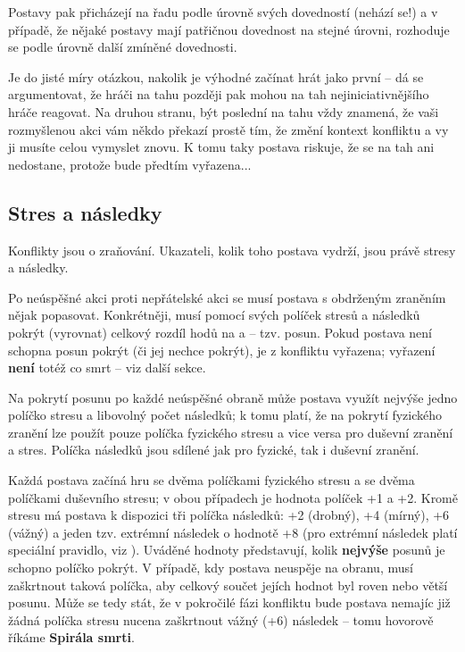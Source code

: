 \documentclass[../main.tex]{subfiles}
\begin{document}
Postavy pak přicházejí na řadu podle úrovně svých dovedností (nehází se!) a v případě, že
nějaké postavy mají patřičnou dovednost na stejné úrovni, rozhoduje se podle úrovně další
zmíněné dovednosti.

Je do jisté míry otázkou, nakolik je výhodné začínat hrát jako první – dá se
argumentovat, že hráči na tahu později pak mohou na tah nejiniciativnějšího hráče
reagovat. Na druhou stranu, být poslední na tahu vždy znamená, že vaši rozmyšlenou akci
vám někdo překazí prostě tím, že změní kontext konfliktu a vy ji musíte celou vymyslet
znovu. K tomu taky postava riskuje, že se na tah ani nedostane, protože bude předtím vyřazena...

\subsection{Stres a následky}
\label{sec:stres-nasledky}

Konflikty jsou o zraňování. Ukazateli, kolik toho postava vydrží, jsou právě stresy a následky.

Po neúspěšné akci  proti nepřátelské akci  se musí postava s
obdrženým zraněním nějak popasovat. Konkrétněji, musí pomocí svých políček stresů a
následků pokrýt (vyrovnat) celkový rozdíl hodů na  a  – tzv. posun.
Pokud postava není schopna posun pokrýt (či jej nechce pokrýt), je z konfliktu vyřazena;
vyřazení \textbf{není} totéž co smrt – viz další sekce.

Na pokrytí posunu po každé neúspěšné obraně může postava využít nejvýše jedno políčko
stresu a libovolný počet následků; k tomu platí, že na pokrytí fyzického zranění lze
použít pouze políčka fyzického stresu a vice versa pro duševní zranění a stres. Políčka
následků jsou sdílené jak pro fyzické, tak i duševní zranění.

Každá postava začíná hru se dvěma políčkami fyzického stresu a se dvěma políčkami
duševního stresu; v obou případech je hodnota políček +1 a +2. Kromě stresu má postava k
dispozici tři políčka následků: +2 (drobný), +4 (mírný), +6 (vážný) a jeden tzv. extrémní
následek o hodnotě +8 (pro extrémní následek platí speciální pravidlo, viz
). Uváděné hodnoty představují, kolik \textbf{nejvýše} posunů je
schopno políčko pokrýt. V případě, kdy postava neuspěje na obranu, musí zaškrtnout taková
políčka, aby celkový součet jejích hodnot byl roven nebo větší posunu. Může se tedy stát,
že v pokročilé fázi konfliktu bude postava nemajíc již žádná políčka stresu nucena
zaškrtnout vážný (+6) následek – tomu hovorově říkáme \textbf{Spirála smrti}.
\end{document}
